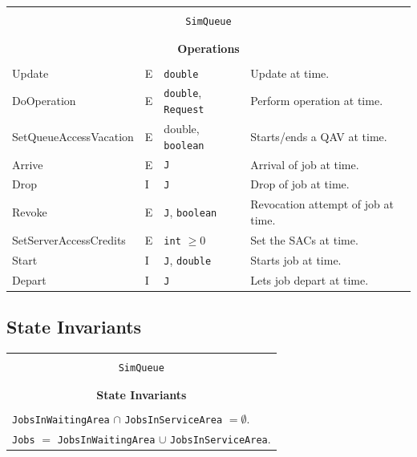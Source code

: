 \documentclass[12pt]{book}
\begin{document}
\begin{tabular}{|l|l|l|l|}
\hline
\multicolumn{4}{|c|}{} \\
\multicolumn{4}{|c|}{\lstinline[basicstyle=\large]{SimQueue}} \\
\multicolumn{4}{|c|}{} \\
\hline
\multicolumn{4}{|c|}{} \\
\multicolumn{4}{|c|}{\bf Operations} \\
\multicolumn{4}{|c|}{} \\
\hline
Update & E & \lstinline|double| & Update at time.\\
\hline
DoOperation & E & \lstinline|double|, \lstinline|Request| & Perform operation at time. \\
\hline
SetQueueAccessVacation & E & double, \lstinline|boolean| & Starts/ends a QAV at time. \\
\hline
Arrive & E & \lstinline|J| & Arrival of job at time. \\
\hline
Drop & I & \lstinline|J| & Drop of job at time. \\
\hline
Revoke & E & \lstinline|J|, \lstinline|boolean| & Revocation attempt of job at time. \\
\hline
SetServerAccessCredits & E & \lstinline|int| $\geq 0$ & Set the SACs at time. \\
\hline
Start & I & \lstinline|J|, \lstinline|double| & Starts job at time. \\
\hline
Depart & I & \lstinline|J| & Lets job depart at time. \\
\hline
\end{tabular}

\subsection{State Invariants}

\begin{tabular}{|l|}
\hline
\multicolumn{1}{|c|}{} \\
\multicolumn{1}{|c|}{\lstinline[basicstyle=\large]{SimQueue}} \\
\multicolumn{1}{|c|}{} \\
\hline
\multicolumn{1}{|c|}{} \\
\multicolumn{1}{|c|}{\bf State  Invariants} \\
\multicolumn{1}{|c|}{} \\
\hline
\lstinline|JobsInWaitingArea| $\cap$ \lstinline|JobsInServiceArea| $= \emptyset$. \\
\lstinline|Jobs| $=$ \lstinline|JobsInWaitingArea| $\cup$ \lstinline|JobsInServiceArea|. \\
\hline
\end{tabular}
\end{document}
